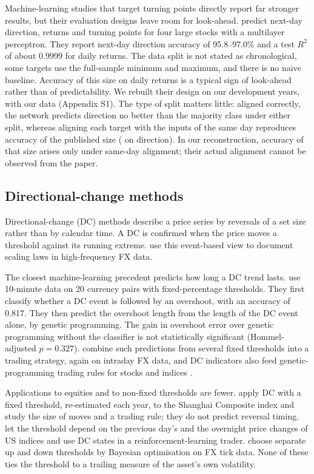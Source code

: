 Machine-learning studies that target turning points directly report far stronger results, but
their evaluation designs leave room for look-ahead. \citet{Abolmakarem2024} predict next-day
direction, returns and turning points for four large stocks with a multilayer perceptron. They
report next-day direction accuracy of 95.8--97.0\% and a test $R^2$ of about 0.9999 for daily
returns. The data split is not stated as chronological, some targets use the full-sample minimum
and maximum, and there is no naive baseline. Accuracy of this size on daily returns is a typical
sign of look-ahead rather than of predictability. We rebuilt their design on our development years,
with our data (Appendix S1). The type of split matters little: aligned correctly, the network
predicts direction no better than the majority class under either split, whereas aligning each
target with the inputs of the same day reproduces accuracy of the published size
(\AbolRandomSameTrend{} on direction). In our reconstruction, accuracy of that size arises only
under same-day alignment; their actual alignment cannot be observed from the paper.

\subsection{Directional-change methods}

Directional-change (DC) methods describe a price series by reversals of a set size rather than by
calendar time. A DC is confirmed when the price moves a threshold against its running extreme.
\citet{GlattfelderDupuisOlsen2011} use this event-based view to document scaling laws in
high-frequency FX data.

The closest machine-learning precedent predicts how long a DC trend lasts. \citet{AdegboyeKampouridis2021}
use 10-minute data on 20 currency pairs with fixed-percentage thresholds. They first classify whether
a DC event is followed by an overshoot, with an accuracy of 0.817. They then predict the overshoot
length from the length of the DC event alone, by genetic programming. The gain in overshoot error
over genetic programming without the classifier is not statistically significant (Hommel-adjusted
$p = 0.327$). \citet{Adegboye2023} combine such predictions from several fixed thresholds into a
trading strategy, again on intraday FX data, and DC indicators also feed genetic-programming
trading rules for stocks and indices \citep{Long2026}.

Applications to equities and to non-fixed thresholds are fewer. \citet{Ma2017} apply DC with a fixed
threshold, re-estimated each year, to the Shanghai Composite index and study the size of moves and
a trading rule; they do not predict reversal timing. \citet{AloudAlkhamees2021} let the threshold
depend on the previous day's and the overnight price changes of US indices and use DC states in a
reinforcement-learning trader. \citet{WuHan2023} choose separate up and down thresholds by Bayesian
optimisation on FX tick data. None of these ties the threshold to a trailing measure of the
asset's own volatility.

